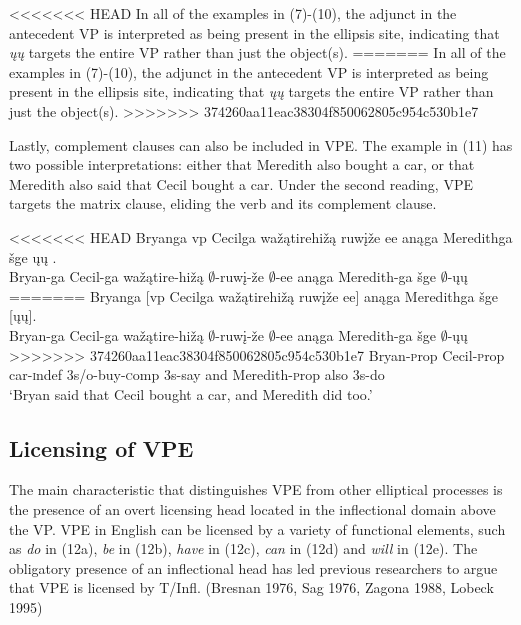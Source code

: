 \documentclass[output=paper]{LSP/langsci}
\begin{document}
<<<<<<< HEAD
In all of the examples in (7)-(10), the adjunct in the antecedent VP is interpreted as being present in the ellipsis site, indicating that \emph{ųų} targets the entire VP rather than just the object(s).
=======
In all of the examples in (7)-(10), the adjunct in the antecedent VP is interpreted as being present in the ellipsis site, indicating that \emph{\k{u}\k{u}} targets the entire VP rather than just the object(s).
>>>>>>> 374260aa11eac38304f850062805c954c530b1e7

Lastly, complement clauses can also be included in VPE. The example in (11) has two possible interpretations: either that Meredith also bought a car, or that Meredith also said that Cecil bought a car. Under the second reading, VPE targets the matrix clause, eliding the verb and its complement clause.

\begin{exe}
\ex
<<<<<<< HEAD
\glll Bryanga {\ob}{vp} Cecilga wažątirehižą ruwįže ee{\cb} anąga Meredithga šge {\ob}ųų{\cb} .\\
Bryan-ga {} Cecil-ga wažątire-hižą $\emptyset$-ruwį-že $\emptyset$-ee anąga Meredith-ga šge $\emptyset$-ųų\\
=======
\glll Bryanga {\textsc [vp} Cecilga wa\v{z}\k{a}tirehi\v{z}\k{a} ruw\k{i}\v{z}e ee{\textsc ]} an\k{a}ga Meredithga \v{s}ge {\textsc [}\k{u}\k{u}{\textsc ]}.\\
Bryan-ga {} Cecil-ga wa\v{z}\k{a}tire-hi\v{z}\k{a} $\emptyset$-ruw\k{i}-\v{z}e $\emptyset$-ee an\k{a}ga Meredith-ga \v{s}ge $\emptyset$-\k{u}\k{u}\\
>>>>>>> 374260aa11eac38304f850062805c954c530b1e7
Bryan-{\textsc prop} {} Cecil-{\textsc prop} car-{\textsc indef} {\textsc 3s/o}-buy-{\textsc comp} {\textsc 3s}-say and Meredith-{\textsc prop} also {\textsc 3s}-do\\
\trans `Bryan said that Cecil bought a car, and Meredith did too.'
\end{exe}


\subsection{Licensing of VPE}

The main characteristic that distinguishes VPE from other elliptical processes is the presence of an overt licensing head located in the inflectional domain above the VP. VPE in English can be licensed by a variety of functional elements, such as \emph{do} in (12a), \emph{be} in (12b), \emph{have} in (12c), \emph{can} in (12d) and \emph{will} in (12e). The obligatory presence of an inflectional head has led previous researchers to argue that VPE is licensed by T/Infl. (Bresnan 1976, Sag 1976, Zagona 1988, Lobeck 1995)
\end{document}

